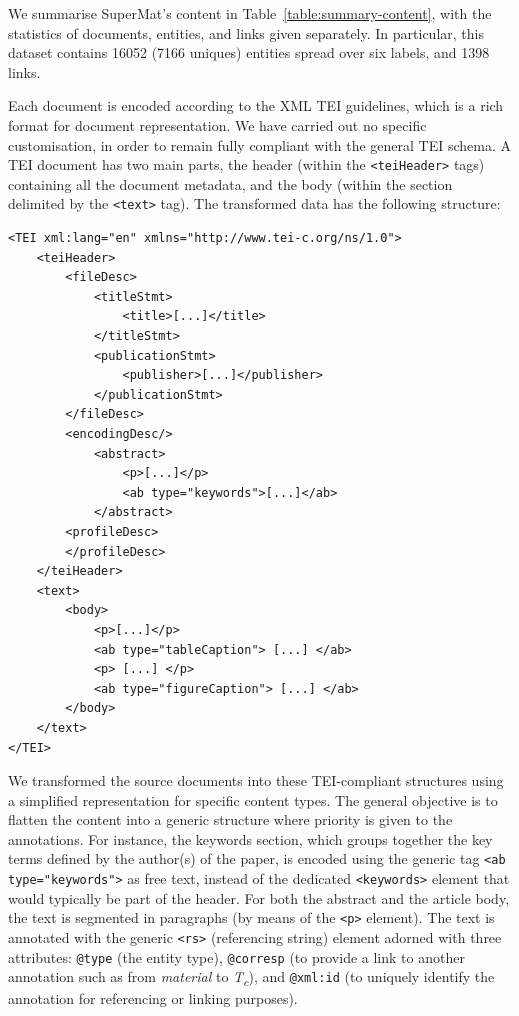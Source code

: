 \documentclass[fleqn,10pt]{wlscirep}
\begin{document}
We summarise SuperMat's content in Table~\ref{table:summary-content}, with the statistics of documents, entities, and links given separately. In particular, this dataset contains 16052 (7166 uniques) entities spread over six labels, and 1398 links. 
    
Each document is encoded according to the XML TEI guidelines, which is a rich format for document representation. 
We have carried out no specific customisation, in order to remain fully compliant with the general TEI schema.
A TEI document has two main parts, the header (within the \texttt{<teiHeader>} tags) containing all the document metadata, and the body (within the section delimited by the \texttt{<text>} tag). 
The transformed data has the following structure: 

\begin{verbatim}
<TEI xml:lang="en" xmlns="http://www.tei-c.org/ns/1.0">
    <teiHeader>
        <fileDesc>
            <titleStmt>
                <title>[...]</title>
            </titleStmt>
            <publicationStmt>
                <publisher>[...]</publisher>
            </publicationStmt>
        </fileDesc>
        <encodingDesc/>
            <abstract>
                <p>[...]</p>
                <ab type="keywords">[...]</ab>
            </abstract>
        <profileDesc>
        </profileDesc>
    </teiHeader>
    <text>
        <body>
            <p>[...]</p>
            <ab type="tableCaption"> [...] </ab>
            <p> [...] </p>
            <ab type="figureCaption"> [...] </ab> 
        </body>
    </text>
</TEI>
\end{verbatim}

We transformed the source documents into these TEI-compliant structures using a simplified representation for specific content types.
The general objective is to flatten the content into a generic structure where priority is given to the annotations.
For instance, the keywords section, which groups together the key terms defined by the author(s) of the paper, is encoded using the generic tag \texttt{<ab type="keywords">} as free text, instead of the dedicated \texttt{<keywords>} element that would typically be part of the header. 
For both the abstract and the article body, the text is segmented in paragraphs (by means of the \texttt{<p>} element). 
The text is annotated with the generic \texttt{<rs>} (referencing string) element adorned with three attributes: \texttt{@type} (the entity type), \texttt{@corresp} (to provide a link to another annotation such as from \textit{material} to \textit{T\textsubscript{c}}), and \texttt{@xml:id} (to uniquely identify the annotation for referencing or linking purposes).
\end{document}
